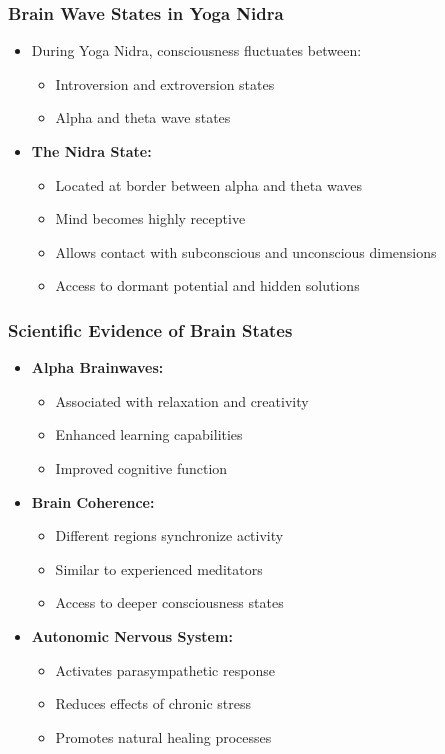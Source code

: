 \begin{frame}[fragile]\frametitle{Brain Wave States in Yoga Nidra}
    \begin{itemize}
        \item During Yoga Nidra, consciousness fluctuates between:
        \begin{itemize}
            \item Introversion and extroversion states
            \item Alpha and theta wave states
        \end{itemize}
        \item \textbf{The Nidra State:}
        \begin{itemize}
            \item Located at border between alpha and theta waves
            \item Mind becomes highly receptive
            \item Allows contact with subconscious and unconscious dimensions
            \item Access to dormant potential and hidden solutions
        \end{itemize}
    \end{itemize}
\end{frame}

\begin{frame}[fragile]\frametitle{Scientific Evidence of Brain States}
    \begin{itemize}
        \item \textbf{Alpha Brainwaves:}
        \begin{itemize}
            \item Associated with relaxation and creativity
            \item Enhanced learning capabilities
            \item Improved cognitive function
        \end{itemize}
        \item \textbf{Brain Coherence:}
        \begin{itemize}
            \item Different regions synchronize activity
            \item Similar to experienced meditators
            \item Access to deeper consciousness states
        \end{itemize}
        \item \textbf{Autonomic Nervous System:}
        \begin{itemize}
            \item Activates parasympathetic response
            \item Reduces effects of chronic stress
            \item Promotes natural healing processes
        \end{itemize}
    \end{itemize}
\end{frame}

